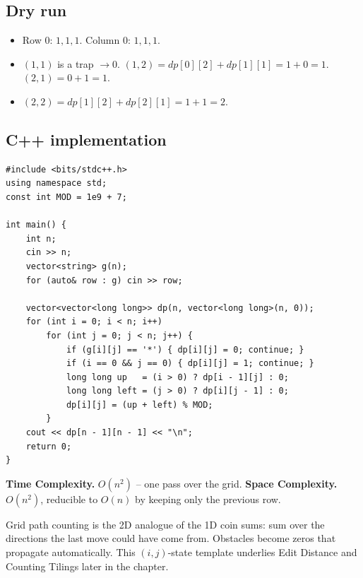 \subsection*{Dry run}


\begin{itemize}
  \item Row $0$: $1,1,1$. Column $0$: $1,1,1$.
  \item $(1,1)$ is a trap $\to0$. $(1,2)=\textit{dp}[0][2]+
        \textit{dp}[1][1]=1+0=1$. $(2,1)=0+1=1$.
  \item $(2,2)=\textit{dp}[1][2]+\textit{dp}[2][1]=1+1=2$.
\end{itemize}

\subsection*{C++ implementation}

\begin{lstlisting}
#include <bits/stdc++.h>
using namespace std;
const int MOD = 1e9 + 7;

int main() {
    int n;
    cin >> n;
    vector<string> g(n);
    for (auto& row : g) cin >> row;

    vector<vector<long long>> dp(n, vector<long long>(n, 0));
    for (int i = 0; i < n; i++)
        for (int j = 0; j < n; j++) {
            if (g[i][j] == '*') { dp[i][j] = 0; continue; }
            if (i == 0 && j == 0) { dp[i][j] = 1; continue; }
            long long up   = (i > 0) ? dp[i - 1][j] : 0;
            long long left = (j > 0) ? dp[i][j - 1] : 0;
            dp[i][j] = (up + left) % MOD;
        }
    cout << dp[n - 1][n - 1] << "\n";
    return 0;
}
\end{lstlisting}

\begin{complexitybox}
\textbf{Time Complexity.} $O(n^2)$ -- one pass over the grid.
\textbf{Space Complexity.} $O(n^2)$, reducible to $O(n)$ by keeping only
the previous row.
\end{complexitybox}

\begin{takeawaybox}
Grid path counting is the 2D analogue of the 1D coin sums: sum over the
directions the last move could have come from. Obstacles become zeros
that propagate automatically. This $(i,j)$-state template underlies Edit
Distance and Counting Tilings later in the chapter.
\end{takeawaybox}
